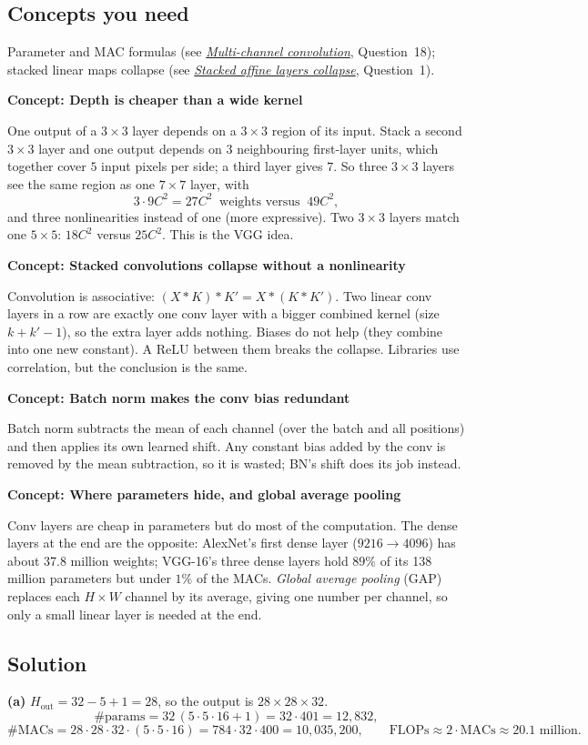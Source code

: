 \documentclass[12pt,a4paper]{article}
\newcommand{\concept}[2]{\par\medskip\phantomsection\label{#1}{\large\bfseries\color{blue!50!black} Concept: #2}\par}
\newcommand{\seeconcept}[3]{(see \hyperref[#1]{\textit{#2}}, Question~#3)}
\begin{document}
\subsection*{Concepts you need}
Parameter and MAC formulas \seeconcept{c:multichannel}{Multi-channel convolution}{18}; stacked linear maps collapse \seeconcept{c:collapse}{Stacked affine layers collapse}{1}.

\concept{c:depth}{Depth is cheaper than a wide kernel}
One output of a $3\times3$ layer depends on a $3\times3$ region of its input. Stack a second $3\times3$ layer and one output depends on $3$ neighbouring first-layer units, which together cover $5$ input pixels per side; a third layer gives $7$. So three $3\times3$ layers see the same region as one $7\times7$ layer, with
\[
3\cdot9C^2=27C^2\ \text{ weights versus }\ 49C^2,
\]
and three nonlinearities instead of one (more expressive). Two $3\times3$ layers match one $5\times5$: $18C^2$ versus $25C^2$. This is the VGG idea.

\concept{c:convassoc}{Stacked convolutions collapse without a nonlinearity}
Convolution is associative: $(X*K)*K'=X*(K*K')$. Two linear conv layers in a row are exactly one conv layer with a bigger combined kernel (size $k+k'-1$), so the extra layer adds nothing. Biases do not help (they combine into one new constant). A ReLU between them breaks the collapse. Libraries use correlation, but the conclusion is the same.

\concept{c:bn}{Batch norm makes the conv bias redundant}
Batch norm subtracts the mean of each channel (over the batch and all positions) and then applies its own learned shift. Any constant bias added by the conv is removed by the mean subtraction, so it is wasted; BN's shift does its job instead.

\concept{c:gap}{Where parameters hide, and global average pooling}
Conv layers are cheap in parameters but do most of the computation. The dense layers at the end are the opposite: AlexNet's first dense layer ($9216\to4096$) has about 37.8 million weights; VGG-16's three dense layers hold $89\%$ of its 138 million parameters but under $1\%$ of the MACs. \emph{Global average pooling} (GAP) replaces each $H\times W$ channel by its average, giving one number per channel, so only a small linear layer is needed at the end.

\subsection*{Solution}
\textbf{(a)} $H_{\text{out}}=32-5+1=28$, so the output is $28\times28\times32$.
\[
\#\text{params}=32\,(5\cdot5\cdot16+1)=32\cdot401=12{,}832,
\]
\[
\#\text{MACs}=28\cdot28\cdot32\cdot(5\cdot5\cdot16)=784\cdot32\cdot400=10{,}035{,}200,\qquad\text{FLOPs}\approx2\cdot\text{MACs}\approx20.1\text{ million}.
\]
\end{document}
